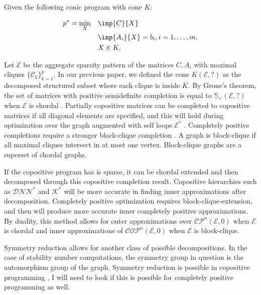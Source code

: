 \documentclass{article}
\newcommand{\es}{\mathcal{E}}
\newcommand{\psd}{\mathbb{S}}
\newcommand{\cs}{\mathcal{C}}
\newcommand{\dnn}{\mathcal{D}\mathcal{N}\mathcal{N}}
\newcommand{\cp}{\mathcal{C}\mathcal{P}}
\newcommand{\cop}{\mathcal{C}\mathcal{O}\mathcal{P}}
\begin{document}
Given the following conic program with cone $K$:

\begin{align}%
    p^* =\min_{X} \quad & \inp{C}{X} \nonumber \\
    & \inp{A_i}{X} = b_i, i = 1, \ldots, m,\label{Eq:SDPprimal}\\
     & X \in K,   \nonumber \\
\end{align}

Let $\es$ be the aggregate sparsity pattern of the matrices $C, A_i$ with maximal cliques $\{\cs_k\}_{k=1}^p$. In our previous paper, we defined the cone $K(\es, ?)$ as the decomposed structured subset where each clique is inside $K$. By Grone's theorem, the set of matrices with positive semidefinite completion is equal to $\psd_+(\es, ?)$ when $\es$ is chordal \cite{grone1984positive}. Partially copositive matrices can be completed to copositive matrices if all diagonal elements are specified, and this will hold during optimization over the graph augmented with self loops $\es^*$ \cite{hogben2005copositive}. Completely positive completions require a stronger block-clique completion \cite{berman2003completely}. A graph is block-clique if all maximal cliques intersect in at most one vertex. Block-clique graphs are a superset of chordal graphs.

If the copositive program has is sparse, it can be chordal extended and then decomposed through this copositive completion result. Copositive hierarchies such as $\dnn^*$ and $\mathcal{K}^*$ will be more accurate in finding inner approximations after decomposition. Completely positive optimization requires block-clique-extension, and then will produce more accurate inner completely positive approximations. By duality, this method allows for outer approximations over $\cp^n(\es, 0)$ when $\es$ is chordal and inner approximations of $\cop^n(\es, 0)$ when $\es$ is block-clique.


Symmetry reduction allows for another class of possible decompositions. In the case of stability number computations, the symmetry group in question is the automorphism group of the graph. Symmetry reduction is possible in copositive programming \cite{dobre2015exploiting}, I will need to look if this is possible for completely positive programming as well.
\end{document}
